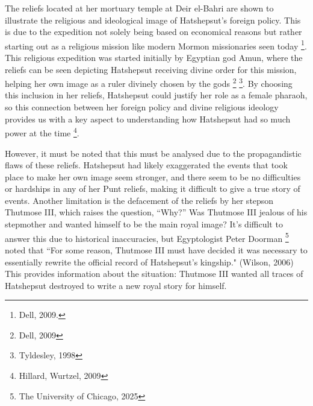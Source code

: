 \documentclass[12pt, letterpaper]{article}
\begin{document}
The reliefs located at her mortuary temple at Deir el-Bahri are shown to illustrate the religious and ideological image of Hatshepsut's foreign policy. This is due to the expedition not solely being based on economical reasons but rather starting out as a religious mission like modern Mormon missionaries seen today \footnote{Dell, 2009.}. This religious expedition was started initially by Egyptian god Amun, where the reliefs can be seen depicting Hatshepsut receiving divine order for this mission, helping her own image as a ruler divinely chosen by the gods \footnote{Dell, 2009} \footnote{Tyldesley, 1998}. By choosing this inclusion in her reliefs, Hatshepsut could justify her role as a female pharaoh, so this connection between her foreign policy and divine religious ideology provides us with a key aspect to understanding how Hatshepsut had so much power at the time \footnote{Hillard, Wurtzel, 2009}.

However, it must be noted that this must be analysed due to the propagandistic flaws of these reliefs. Hatshepsut had likely exaggerated the events that took place to make her own image seem stronger, and there seem to be no difficulties or hardships in any of her Punt reliefs, making it difficult to give a true story of events. Another limitation is the defacement of the reliefs by her stepson Thutmose III, which raises the question, “Why?” Was Thutmose III jealous of his stepmother and wanted himself to be the main royal image? It's difficult to answer this due to historical inaccuracies, but Egyptologist Peter Doorman \footnote{The University of Chicago, 2025} noted that “For some reason, Thutmose III must have decided it was necessary to essentially rewrite the official record of Hatshepsut's kingship." (Wilson, 2006) This provides information about the situation: Thutmose III wanted all traces of Hatshepsut destroyed to write a new royal story for himself.
\end{document}
